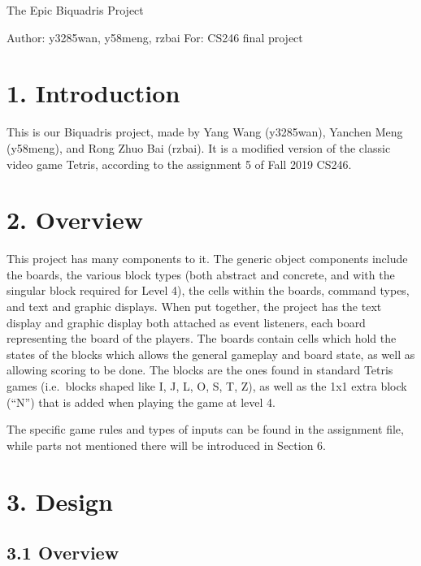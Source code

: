 \documentclass[
]{article}
\date{}
\begin{document}
The Epic Biquadris Project

Author: y3285wan, y58meng, rzbai For: CS246 final project

\hypertarget{introduction}{%
\section{1. Introduction}\label{introduction}}

This is our Biquadris project, made by Yang Wang (y3285wan), Yanchen
Meng (y58meng), and Rong Zhuo Bai (rzbai). It is a modified version of
the classic video game Tetris, according to the assignment 5 of Fall
2019 CS246.

\hypertarget{overview}{%
\section{2. Overview}\label{overview}}

This project has many components to it. The generic object components
include the boards, the various block types (both abstract and concrete,
and with the singular block required for Level 4), the cells within the
boards, command types, and text and graphic displays. When put together,
the project has the text display and graphic display both attached as
event listeners, each board representing the board of the players. The
boards contain cells which hold the states of the blocks which allows
the general gameplay and board state, as well as allowing scoring to be
done. The blocks are the ones found in standard Tetris games
(i.e.~blocks shaped like I, J, L, O, S, T, Z), as well as the 1x1 extra
block (``N'') that is added when playing the game at level 4.

The specific game rules and types of inputs can be found in the
assignment file, while parts not mentioned there will be introduced in
Section 6.

\hypertarget{design}{%
\section{3. Design}\label{design}}

\hypertarget{overview-1}{%
\subsection{3.1 Overview}\label{overview-1}}
\end{document}
